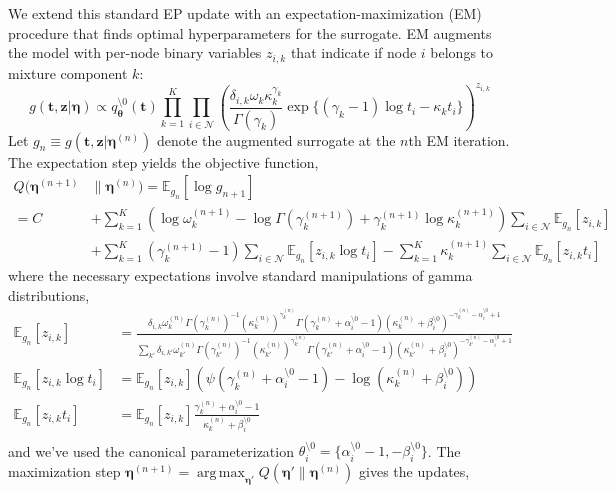 \documentclass{article}
\DeclareMathOperator*{\argmax}{arg\,max}
\begin{document}
We extend this standard EP update with an expectation-maximization (EM) procedure that finds optimal hyperparameters for the surrogate. EM augments the model with per-node binary variables $z_{i,k}$ that indicate if node $i$ belongs to mixture component $k$: 
\[
  g(\bm t, \bm z | \bm \eta) \propto q_{\bm \theta}^{\setminus 0}(\bm t) \prod_{k=1}^K \prod_{i \in \mathcal{N}} \left( \frac{\delta_{i,k} \omega_{k} \kappa_k^{\gamma_k}}{\Gamma(\gamma_k)}\exp\{(\gamma_k - 1) \log t_i - \kappa_k t_i\} \right)^{z_{i,k}}
\]
Let $g_n \equiv g(\bm t, \bm z | \bm \eta^{(n)})$ denote the augmented surrogate at the $n$th EM iteration. The expectation step yields the objective function,
\[
  \begin{aligned}
    Q(\bm \eta^{(n+1)} & \parallel \bm \eta^{(n)}) = \mathbb{E}_{g_n}[\log g_{n+1}] \\
    = C & + \sum_{k=1}^K (\log \omega_k^{(n+1)} - \log \Gamma(\gamma_k^{(n+1)}) + \gamma_k^{(n+1)} \log \kappa_k^{(n+1)} )\sum_{i \in \mathcal{N}} \mathbb{E}_{g_n}[z_{i,k}] \\
  & + \sum_{k=1}^K (\gamma_k^{(n+1)} - 1) \sum_{i \in \mathcal{N}} \mathbb{E}_{g_n}[z_{i,k} \log t_i] - \sum_{k=1}^K \kappa^{(n+1)}_k \sum_{i \in \mathcal{N}} \mathbb{E}_{g_n}[z_{i,k} t_i] 
  \end{aligned}
\]
where the necessary expectations involve standard manipulations of gamma distributions,
\[
  \begin{aligned}
    \mathbb{E}_{g_n}[z_{i,k}] & = \frac{ \delta_{i,k} \omega_k^{(n)} \Gamma(\gamma_k^{(n)})^{-1} (\kappa_k^{(n)})^{\gamma_k^{(n)}} \Gamma(\gamma_k^{(n)} + \alpha_i^{\setminus 0} - 1) (\kappa_k^{(n)} + \beta^{\setminus 0}_i)^{-\gamma_k^{(n)} - \alpha_i^{\setminus 0} + 1} }{ \sum_{k'} \delta_{i,k'} \omega_{k'}^{(n)} \Gamma(\gamma_{k'}^{(n)})^{-1} (\kappa_{k'}^{(n)})^{\gamma_{k'}^{(n)}} \Gamma(\gamma_{k'}^{(n)} + \alpha_i^{\setminus 0} - 1) (\kappa_{k'}^{(n)} + \beta^{\setminus 0}_i)^{-\gamma_{k'}^{(n)} - \alpha_i^{\setminus 0} + 1} }\\
    \mathbb{E}_{g_n}[z_{i,k} \log t_i] & = \mathbb{E}_{g_n}[z_{i,k}] \left(\psi(\gamma^{(n)}_k + \alpha_i^{\setminus 0} - 1) - \log(\kappa^{(n)}_k + \beta_i^{\setminus 0}) \right) \\
    \mathbb{E}_{g_n}[z_{i,k} t_i] & = \mathbb{E}_{g_n}[z_{i,k}] \frac{\gamma^{(n)}_k + \alpha_i^{\setminus 0} - 1}{\kappa^{(n)}_k + \beta_i^{\setminus 0}} \\
  \end{aligned}
\]
and we've used the canonical parameterization $\theta_i^{\setminus 0} = \{\alpha^{\setminus 0}_i - 1, -\beta^{\setminus 0}_i \}$. The maximization step $\bm \eta^{(n+1)} = \argmax_{\bm \eta'} Q(\bm \eta' \parallel \bm \eta^{(n)})$ gives the updates,
\end{document}
